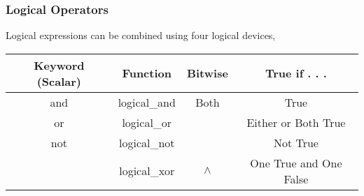 \documentclass[KSmainSlides.tex]{subfiles}
\begin{document}
\begin{frame}[fragile]
\frametitle{Logical Operators}


Logical expressions can be combined using four logical devices,

\begin{tabular}{|c|c|c|c|}
	\hline Keyword (Scalar) & Function & Bitwise & True if . . . \\ \hline
	and & logical\_and & Both & True \\ \hline
	or  & logical\_or & &Either or Both True \\ \hline
	not & logical\_not & ~ & Not True \\ \hline
	& logical\_xor & $\wedge$ & One True and One False \\ \hline
\end{tabular} 

\end{frame}
\end{document}
